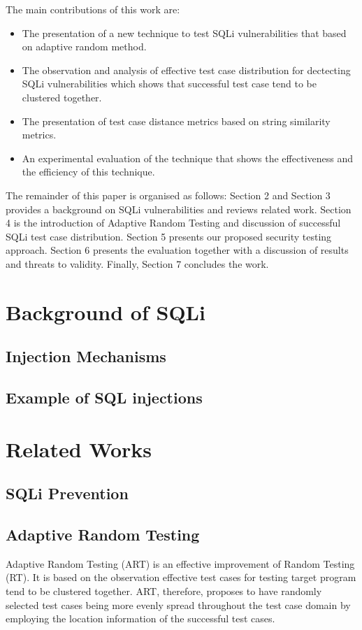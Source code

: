 \documentclass{sig-alternate}
\begin{document}
The main contributions of this work are:
\begin{itemize}
\item The presentation of a new technique to test SQLi vulnerabilities that based on adaptive random method.
\item The observation and analysis of effective test case distribution for dectecting SQLi vulnerabilities which shows that successful test case tend to be clustered together. 
\item The presentation of test case distance metrics based on string similarity metrics.
\item An experimental evaluation of the technique that shows the effectiveness
and the efficiency of this technique.
\end{itemize}

The remainder of this paper is organised as follows: Section 2 and Section 3 provides a background on SQLi vulnerabilities and reviews related work. Section 4 is the introduction of Adaptive Random Testing and discussion of successful SQLi test case distribution. Section 5 presents our proposed security testing approach. Section 6 presents the evaluation together with a discussion of results and threats to validity. Finally, Section 7 concludes the work.



\section{Background of SQLi}
\subsection{Injection Mechanisms}
\subsection{Example of SQL injections}
\section{Related Works}
\subsection{SQLi Prevention}
\subsection{Adaptive Random Testing}
Adaptive Random Testing (ART) is an effective improvement of Random Testing (RT). It is based on the observation effective test cases for testing target program tend to be clustered together. ART, therefore, proposes to have randomly selected test cases being more evenly spread throughout the test case domain by employing the location information of the successful test cases.\cite{39239038}
\end{document}
